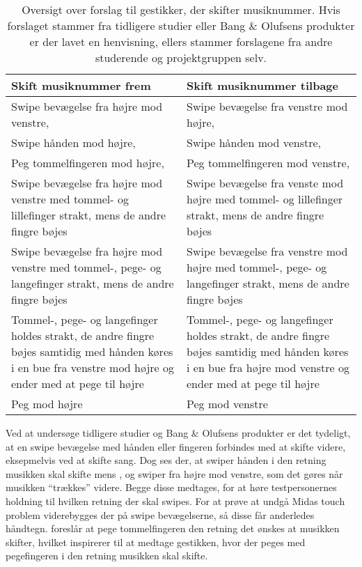 %
\begin{table}[H]
	\centering
	\begin{tabular}{| p{6cm} | p{6cm} |}
		\hline
		\textbf{Skift musiknummer frem} & \textbf{Skift musiknummer tilbage} \\ \hline
		Swipe bevægelse fra højre mod venstre, \parencite[s. 48]{WEB:Beosound2, WEB:BeosoundMoment, PDF:UserDefinedGesturesTV} & Swipe bevægelse fra venstre mod højre, \parencite[s. 48]{WEB:Beosound2, WEB:BeosoundMoment, PDF:UserDefinedGesturesTV} \\ \hline
		Swipe hånden mod højre, \parencite[s. 166]{PDF:ComparingInputModalities}  & Swipe hånden mod venstre, \parencite[s. 166]{PDF:ComparingInputModalities}  \\ \hline
		Peg tommelfingeren mod højre, \parencite[s. 166]{PDF:ComparingInputModalities} & Peg tommelfingeren mod venstre, \parencite[s. 166]{PDF:ComparingInputModalities} \\ \hline
		Swipe bevægelse fra højre mod venstre med tommel- og lillefinger strakt, mens de andre fingre bøjes & Swipe bevægelse fra venste mod højre med tommel- og lillefinger strakt, mens de andre fingre bøjes \\ \hline
		Swipe bevægelse fra højre mod venstre med tommel-, pege- og langefinger strakt, mens de andre fingre bøjes & Swipe bevægelse fra venstre mod højre med tommel-, pege- og langefinger strakt, mens de andre fingre bøjes \\ \hline
		Tommel-, pege- og langefinger holdes strakt, de andre fingre bøjes samtidig med hånden køres i en bue fra venstre mod højre og ender med at pege til højre & Tommel-, pege- og langefinger holdes strakt, de andre fingre bøjes samtidig med hånden køres i en bue fra højre mod venstre og ender med at pege til højre\\ \hline
		Peg mod højre & Peg mod venstre\\ \hline
	\end{tabular}
	\caption{Oversigt over forslag til gestikker, der skifter musiknummer. Hvis forslaget stammer fra tidligere studier eller Bang $\&$ Olufsens produkter er der lavet en henvisning, ellers stammer forslagene fra andre studerende og projektgruppen selv.}
	\label{tab:IndsamledeGestikkerSkift}
\end{table}
\noindent
%
Ved at undersøge tidligere studier og Bang $\&$ Olufsens produkter er det tydeligt, at en swipe bevægelse med hånden eller fingeren forbindes med at skifte videre, eksepmelvis ved at skifte sang. Dog ses der, at \textcite[s. 166]{PDF:ComparingInputModalities} swiper hånden i den retning musikken skal skifte mens \textcite[s. 48]{PDF:UserDefinedGesturesTV}, \textcite{WEB:Beosound2} og \textcite{WEB:BeosoundMoment} swiper fra højre mod venstre, som det gøres når musikken \enquote{trækkes} videre. Begge disse medtages, for at høre testpersonernes holdning til hvilken retning der skal swipes. For at prøve at undgå Midas touch problem viderebygges der på swipe bevægelserne, så disse får anderledes håndtegn. \textcite[s. 166]{PDF:ComparingInputModalities} foreslår at pege tommelfingeren den retning det ønskes at musikken skifter, hvilket inspirerer til at medtage gestikken, hvor der peges med pegefingeren i den retning musikken skal skifte. 
